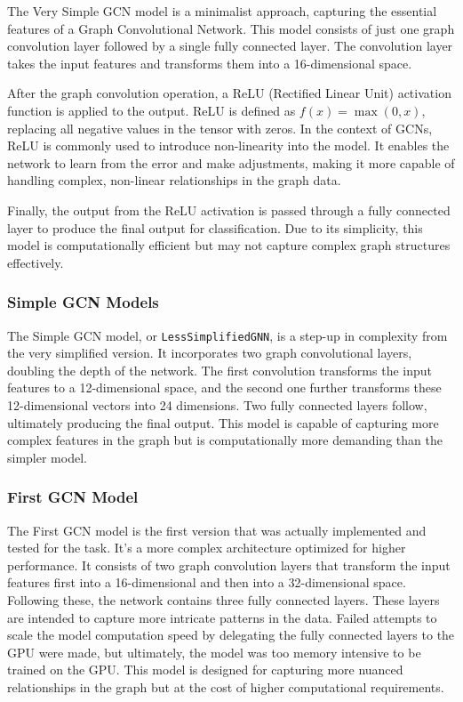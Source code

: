 The Very Simple GCN model is a minimalist approach, capturing the essential features of a Graph Convolutional Network. This model consists of just one graph convolution layer followed by a single fully connected layer. The convolution layer takes the input features and transforms them into a 16-dimensional space.

After the graph convolution operation, a ReLU (Rectified Linear Unit) activation function is applied to the output. ReLU is defined as \( f(x) = \max(0, x) \), replacing all negative values in the tensor with zeros. In the context of GCNs, ReLU is commonly used to introduce non-linearity into the model. It enables the network to learn from the error and make adjustments, making it more capable of handling complex, non-linear relationships in the graph data.

Finally, the output from the ReLU activation is passed through a fully connected layer to produce the final output for classification. Due to its simplicity, this model is computationally efficient but may not capture complex graph structures effectively.

\subsubsection{Simple GCN Models}

The Simple GCN model, or \texttt{LessSimplifiedGNN}, is a step-up in complexity from the very simplified version. It incorporates two graph convolutional layers, doubling the depth of the network. The first convolution transforms the input features to a 12-dimensional space, and the second one further transforms these 12-dimensional vectors into 24 dimensions. Two fully connected layers follow, ultimately producing the final output. This model is capable of capturing more complex features in the graph but is computationally more demanding than the simpler model.

\subsubsection{First GCN Model}

The First GCN model is the first version that was actually implemented and tested for the task. It's a more complex architecture optimized for higher performance. It consists of two graph convolution layers that transform the input features first into a 16-dimensional and then into a 32-dimensional space. Following these, the network contains three fully connected layers. These layers are intended to capture more intricate patterns in the data. Failed attempts to scale the model computation speed by delegating the fully connected layers to the GPU were made, but ultimately, the model was too memory intensive to be trained on the GPU. This model is designed for capturing more nuanced relationships in the graph but at the cost of higher computational requirements.

